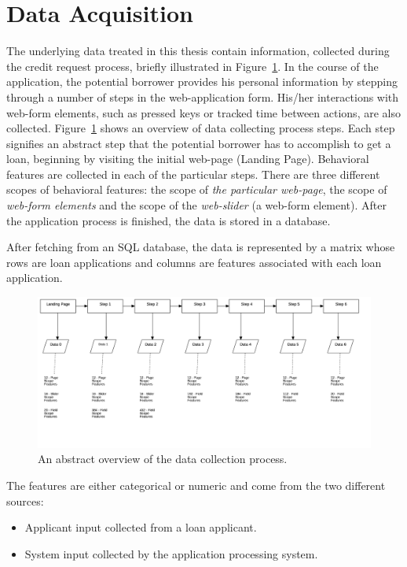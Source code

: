 \section{Data Acquisition}\label{Ch:2:Acquisition}
The underlying data treated in this thesis contain information, collected during the credit request process, briefly illustrated in Figure~\ref{fig:behav-data}. In the course of the application, the potential borrower provides his personal information by stepping through a number of steps in the web-application form. His/her interactions with web-form elements, such as pressed keys or tracked time between actions, are also collected. Figure~\ref{fig:behav-data} shows an overview of data collecting process steps. Each step signifies an abstract step that the potential borrower has to accomplish to get a loan, beginning by visiting the initial web-page (Landing Page). Behavioral features are collected in each of the particular steps. There are three different scopes of behavioral features: the scope of \textit{the particular web-page}, the scope of \textit{web-form elements} and the scope of the \textit{web-slider} (a web-form element). After the application process is finished, the data is stored in a database. 

After fetching from an SQL database, the data is represented by a matrix whose rows are loan applications and columns are features associated with each loan application. 

\begin{figure}[h!]
    \hspace*{-1,5cm}
    \centering
    \includegraphics[scale=0.23]{Graphics/FlowchartDiagram1.png}
    \caption{An abstract overview of the data collection process.}
    \label{fig:behav-data}
\end{figure}

The features are either categorical or numeric and come from the two different sources:
\begin{itemize}
    \item Applicant input collected from a loan applicant.
    \item System input collected by the application processing system.
\end{itemize}

